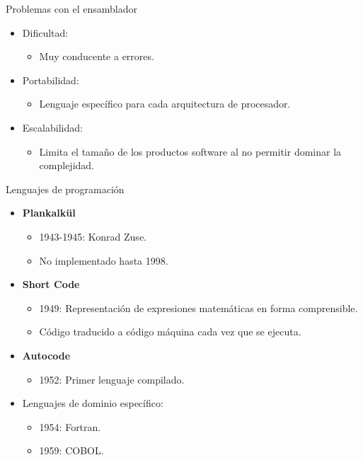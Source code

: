\begin{frame}[t]{Problemas con el ensamblador}
  \begin{itemize}
    \item Dificultad:
      \begin{itemize}
        \item Muy conducente a errores.
      \end{itemize}
    \item Portabilidad:
      \begin{itemize}
        \item Lenguaje específico para cada arquitectura de procesador.
      \end{itemize}
    \item Escalabilidad:
      \begin{itemize}
        \item Limita el tamaño de los productos software al no permitir dominar la complejidad.
      \end{itemize}
  \end{itemize}
\end{frame}

\begin{frame}[t]{Lenguajes de programación}
  \begin{itemize}
    \item \textbf{\color{blue}Plankalk\"{u}l}
      \begin{itemize}
        \item 1943-1945: Konrad Zuse.
        \item No implementado hasta 1998.
      \end{itemize}
    \pause
    \item \textbf{\color{blue}Short Code}
      \begin{itemize}
        \item 1949: Representación de expresiones matemáticas en forma comprensible.
        \item Código traducido a código máquina cada vez que se ejecuta.
      \end{itemize}
    \pause
    \item \textbf{\color{blue}Autocode}
      \begin{itemize}
        \item 1952: Primer lenguaje compilado.
      \end{itemize}
    \pause
    \item Lenguajes de dominio específico:
      \begin{itemize}
        \item 1954: Fortran.
        \item 1959: COBOL.
      \end{itemize}
  \end{itemize}
\end{frame}

